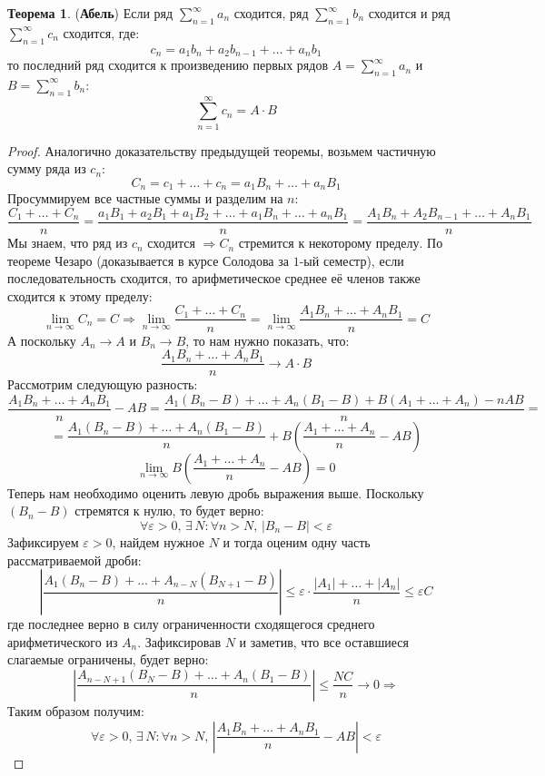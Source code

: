 \documentclass[12pt]{article}
\newcommand{\VE}{\varepsilon}
\theoremstyle{definition}
\newtheorem{theorem}{Теорема}
\DeclareMathOperator*{\dsum}{\displaystyle\sum}
\begin{document}
\begin{theorem}(\textbf{Абель})
	Если ряд $\dsum\limits_{n = 1}^{\infty} a_n$ сходится, ряд $\dsum\limits_{n = 1}^{\infty} b_n$ сходится и ряд $\dsum\limits_{n = 1}^{\infty} c_n$ сходится, где:
	$$
		c_n = a_1 b_n + a_2 b_{n-1} + \dotsc + a_n b_1
	$$
	то последний ряд сходится к произведению первых рядов $A = \dsum\limits_{n = 1}^{\infty} a_n$ и $B = \dsum\limits_{n = 1}^{\infty} b_n$: 
	$$
		\dsum\limits_{n = 1}^{\infty} c_n  = A{\cdot}B
	$$
\end{theorem}
\begin{proof}
	Аналогично доказательству предыдущей теоремы, возьмем частичную сумму ряда из $c_n$:
	$$
		C_n = c_1 + \dotsc + c_n = a_1 B_n + \dotsc + a_n B_1
	$$
	Просуммируем все частные суммы и разделим на $n$:
	$$
		\dfrac{C_1 + \dotsc + C_n}{n} = \dfrac{a_1 B_1 + a_2 B_1 + a_1 B_2 + \dotsc + a_1 B_n + \dotsc + a_n B_1}{n} = \dfrac{A_1 B_n + A_2 B_{n-1} + \dotsc + A_n B_1}{n}
	$$
	Мы знаем, что ряд из $c_n$ сходится $\Rightarrow C_n$ стремится к некоторому пределу. По теореме Чезаро (доказывается в курсе Солодова за $1$-ый семестр), если последовательность сходится, то арифметическое среднее её членов также сходится к этому пределу:
	$$
		\lim\limits_{n \to \infty}C_n = C \Rightarrow \lim\limits_{n \to \infty}\dfrac{C_1 + \dotsc + C_n}{n} =  \lim\limits_{n \to \infty}\dfrac{A_1 B_n + \dotsc + A_n B_1}{n} = C
	$$
	А поскольку $A_n \to A$ и $B_n \to B$, то нам нужно показать, что:
	$$
		\dfrac{A_1 B_n + \dotsc + A_n B_1}{n} \to A{\cdot}B
	$$
	Рассмотрим следующую разность:
	$$
		\dfrac{A_1 B_n + \dotsc + A_n B_1}{n} - AB = \dfrac{A_1 (B_n - B) + \dotsc + A_n (B_1 - B) + B(A_1 + \dotsc + A_n) -n AB}{n} =
	$$
	$$
		= \dfrac{A_1 (B_n - B) + \dotsc + A_n (B_1 - B)}{n} + B\left(\dfrac{A_1 + \dotsc + A_n}{n} - AB\right)
	$$
	$$
		\lim\limits_{n \to \infty}B\left(\dfrac{A_1 + \dotsc + A_n}{n} - AB\right) = 0
	$$
	Теперь нам необходимо оценить левую дробь выражения выше. Поскольку $(B_n - B)$ стремятся к нулю, то будет верно: 
	$$
		\forall \VE > 0, \, \exists \, N \colon \forall n > N,\, |B_n - B| < \VE
	$$ 
	Зафиксируем $\VE > 0$, найдем нужное $N$ и тогда оценим одну часть рассматриваемой дроби:
	$$
		\left| \dfrac{A_1 (B_n - B) + \dotsc + A_{n-N} (B_{N + 1} - B)}{n}\right| \leq \VE{\cdot}\dfrac{|A_1| + \dotsc + |A_n| }{n} \leq \VE C
	$$
	где последнее верно в силу ограниченности сходящегося среднего арифметического из $A_n$. Зафиксировав $N$ и заметив, что все оставшиеся слагаемые ограничены, будет верно:
	$$
		\left| \dfrac{A_{n - N + 1} (B_{N} - B) + \dotsc + A_{n} (B_{1} - B)}{n}\right| \leq \dfrac{NC}{n} \to 0 \Rightarrow
	$$
	Таким образом получим:
	$$
		\forall \VE > 0, \, \exists \, N \colon \forall n > N,\, \left|\dfrac{A_1 B_n + \dotsc + A_n B_1}{n} - AB \right| < \VE
	$$
\end{proof}
\newpage
\end{document}

